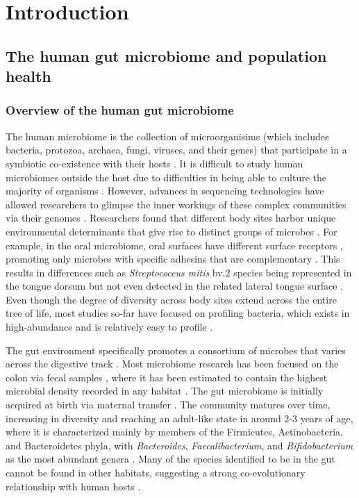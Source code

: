 \chapter{Introduction}

\section{The human gut microbiome and population health}
\subsection{Overview of the human gut microbiome}

The human microbiome is the collection of microorganisims (which includes bacteria, protozoa, archaea, fungi, viruses, and their genes) that participate in a symbiotic co-existence with their hosts \cite{ursell2012defining}. It is difficult to study human microbiomes outside the host due to difficulties in being able to culture the majority of organisms \cite{walker2014phylogeny}. However, advances in sequencing technologies have allowed researchers to glimpse the inner workings of these complex communities via their genomes \cite{zuniga2017elucidation}. Researchers found that different body sites harbor unique environmental determinants that give rise to distinct groups of microbes \cite{consortium2012structure}. For example, in the oral microbiome, oral surfaces have different surface receptors \cite{gibbons1989bacterial}, promoting only microbes with specific adhesins that are complementary \cite{aas2005defining}. This results in differences such as \emph{Streptococcus mitis} bv.2 species being represented in the tongue dorsum but not even detected in the related lateral tongue surface \cite{aas2005defining}. Even though the degree of diversity across body sites extend across the entire tree of life, most studies so-far have focused on profiling bacteria, which exists in high-abundance and is relatively easy to profile \cite{cani2018human}. 

The gut environment specifically promotes a consortium of microbes that varies across the digestive track \cite{mailhe2018repertoire, donaldson2016gut}. Most microbiome research has been focused on the colon via fecal samples \cite{tang2020current}, where it has been estimated to contain the highest microbial density recorded in any habitat \cite{shapira2016gut}. The gut microbiome is initially acquired at birth via maternal transfer \cite{shao2019stunted, backhed2015dynamics, yassour2016natural}. The community matures over time, increasing in diversity and reaching an adult-like state in around 2-3 years of age, where it is characterized mainly by members of the Firmicutes, Actinobacteria, and Bacteroidetes phyla, with \emph{Bacteroides}, \emph{Faecalibacterium}, and \emph{Bifidobacterium} as the most abundant genera \cite{king2019baseline, metahitconsortiumadditionalmembers2011enterotypes}. Many of the species identified to be in the gut cannot be found in other habitats, suggesting a strong co-evolutionary relationship with human hosts \cite{ley2006ecological}.  

